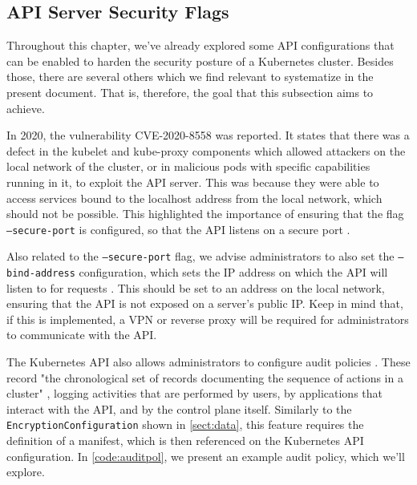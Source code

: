 \documentclass[a4paper,11pt,openright,BCOR=15mm]{scrbook}
\begin{document}
\subsection{API Server Security Flags}



%
%
%
%
%
%
%
%


Throughout this chapter, we've already explored some API configurations that can be enabled to harden the security posture of a Kubernetes cluster. Besides those, there are several others which we find relevant to systematize in the present document. That is, therefore, the goal that this subsection aims to achieve.


In 2020, the vulnerability CVE-2020-8558 \cite{national_institute_of_standards_and_technology_nvd_2020} was reported. It states that there was a defect in the kubelet and kube-proxy components which allowed attackers on the local network of the cluster, or in malicious pods with specific capabilities running in it, to exploit the API server. This was because they were able to access services bound to the localhost address from the local network, which should not be possible. This highlighted the importance of ensuring that the flag \texttt{--secure-port} is configured, so that the API listens on a secure port \cite{the_linux_foundation_kube-apiserver_2024}.

Also related to the \texttt{--secure-port} flag, we advise administrators to also set the \texttt{--bind-address} configuration, which sets the IP address on which the API will listen to for requests \cite{the_linux_foundation_kube-apiserver_2024}. This should be set to an address on the local network, ensuring that the API is not exposed on a server's public IP. Keep in mind that, if this is implemented, a VPN or reverse proxy will be required for administrators to communicate with the API.

The Kubernetes API also allows administrators to configure audit policies \cite{the_linux_foundation_auditing_2024}. These record "the chronological set of records documenting the sequence of actions in a cluster" \cite{the_linux_foundation_auditing_2024}, logging activities that are performed by users, by applications that interact with the API, and by the control plane itself. Similarly to the \texttt{EncryptionConfiguration} shown in \ref{sect:data}, this feature requires the definition of a manifest, which is then referenced on the Kubernetes API configuration. In \ref{code:auditpol}, we present an example audit policy, which we'll explore.
\end{document}
